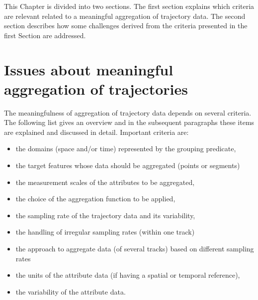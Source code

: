 \documentclass[12pt, oneside, a4paper]{scrbook}
\begin{document}
This Chapter is divided into two sections. 
The first section explains which criteria are relevant related to a meaningful aggregation of trajectory data. 
The second section describes how some challenges derived from the criteria presented in the first Section are addressed.

\section{Issues about meaningful aggregation of trajectories}
\label{sec:meaningfulissues}

The meaningfulness of aggregation of trajectory data depends on several criteria. The following list gives an overview and in the subsequent paragraphs these items are explained and discussed in detail. Important criteria are:

\begin{itemize}
\item the domains (space and/or time) represented by the grouping predicate, 
\item the target features whose data should be aggregated (points or segments) 
\item the measurement scales of the attributes to be aggregated, 
\item the choice of the aggregation function to be applied, 
\item the sampling rate of the trajectory data and its variability, 
\item the handling of irregular sampling rates (within one track) 
\item the approach to aggregate data (of several tracks) based on different sampling rates
\item the units of the attribute data (if having a spatial or temporal reference),  
\item the variability of the attribute data.
\end{itemize}

\par\medskip
\end{document}
